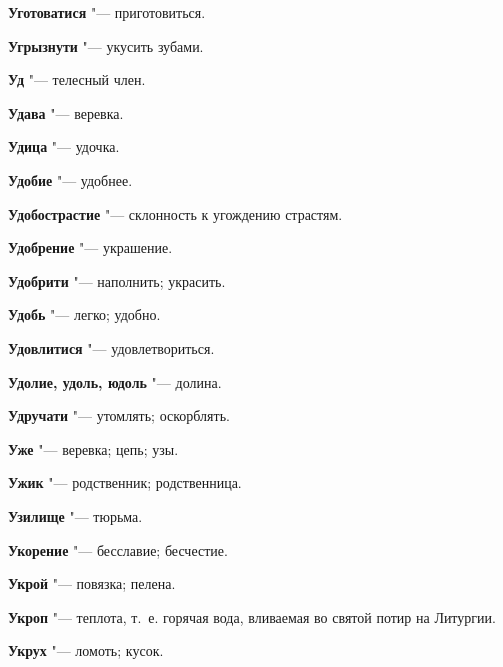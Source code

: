 \begin{mymulticols}{2}
\noindent\textbf{Уготоватися} "--- приготовиться. 




\noindent\textbf{Угрызнути} "--- укусить зубами. 




\noindent\textbf{Уд} "--- телесный член. 




\noindent\textbf{Удава} "--- веревка. 




\noindent\textbf{Удица} "--- удочка. 




\noindent\textbf{Удобие} "--- удобнее. 




\noindent\textbf{Удобострастие} "--- склонность к угождению страстям. 




\noindent\textbf{Удобрение} "--- украшение. 




\noindent\textbf{Удобрити} "--- наполнить; украсить. 




\noindent\textbf{Удобь} "--- легко; удобно. 




\noindent\textbf{Удовлитися} "--- удовлетвориться. 




\noindent\textbf{Удолие, удоль, юдоль} "--- долина. 




\noindent\textbf{Удручати} "--- утомлять; оскорблять. 




\noindent\textbf{Уже} "--- веревка; цепь; узы. 




\noindent\textbf{Ужик} "--- родственник; родственница. 




\noindent\textbf{Узилище} "--- тюрьма. 




\noindent\textbf{Укорение} "--- бесславие; бесчестие. 




\noindent\textbf{Укрой} "--- повязка; пелена. 




\noindent\textbf{Укроп} "--- теплота, т.~е. горячая вода, вливаемая во святой потир на Литургии. 




\noindent\textbf{Укрух} "--- ломоть; кусок. 





\end{mymulticols}
